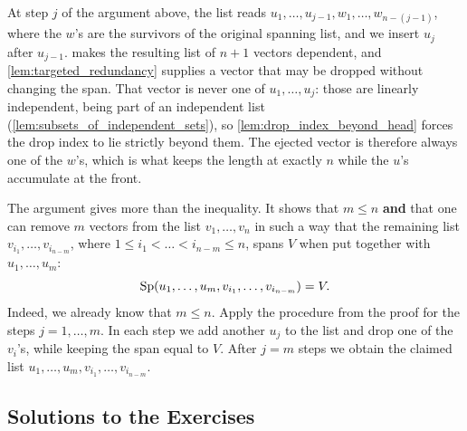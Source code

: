 \begin{remark}
\label{rem:steinitz_general_step}
At step $j$ of the argument above, the list reads $u_1, \dots, u_{j-1}, w_1, \dots, w_{n-(j-1)}$, where the $w$'s are the survivors of the original spanning list, and we insert $u_j$ after $u_{j-1}$.  makes the resulting list of $n+1$ vectors dependent, and \cref{lem:targeted_redundancy} supplies a vector that may be dropped without changing the span. That vector is never one of $u_1, \dots, u_j$: those are linearly independent, being part of an independent list (\cref{lem:subsets_of_independent_sets}), so \cref{lem:drop_index_beyond_head} forces the drop index to lie strictly beyond them. The ejected vector is therefore always one of the $w$'s, which is what keeps the length at exactly $n$ while the $u$'s accumulate at the front.
\end{remark}

\begin{remark}
\label{rem:steinitz_stronger_form}
The argument gives more than the inequality. It shows that $m \le n$ \textbf{and} that one can remove $m$ vectors from the list $v_1, \dots, v_n$ in such a way that the remaining list $v_{i_1}, \dots, v_{i_{n-m}}$, where $1 \le i_1 < \dots < i_{n-m} \le n$, spans $V$ when put together with $u_1, \dots, u_m$:
\[
\operatorname{Sp}(u_1, \dots, u_m, v_{i_1}, \dots, v_{i_{n-m}}) = V.
\]
Indeed, we already know that $m \le n$. Apply the procedure from the proof for the steps $j = 1, \dots, m$. In each step we add another $u_j$ to the list and drop one of the $v_i$'s, while keeping the span equal to $V$. After $j = m$ steps we obtain the claimed list $u_1, \dots, u_m, v_{i_1}, \dots, v_{i_{n-m}}$.
\end{remark}

\subsection{Solutions to the Exercises}
\label{sec:solutions_bases_part_a}

